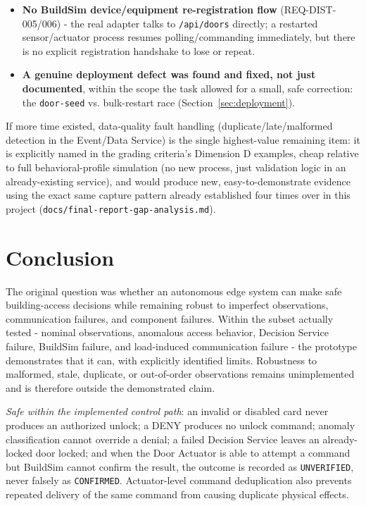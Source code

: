 \documentclass[11pt]{article}
\begin{document}
\begin{itemize}
(REQ-DATA-004/005, REQ-RES-003/005) - no freshness, ordering, or
deduplication logic exists anywhere in the pipeline yet.
\item \textbf{No BuildSim device/equipment re-registration flow}
(REQ-DIST-005/006) - the real adapter talks to \texttt{/api/doors}
directly; a restarted sensor/actuator process resumes polling/commanding
immediately, but there is no explicit registration handshake to lose or
repeat.
\item \textbf{A genuine deployment defect was found and fixed, not just
documented}, within the scope the task allowed for a small, safe
correction: the \texttt{door-seed} vs. bulk-restart race
(Section~\ref{sec:deployment}).
\end{itemize}

If more time existed, data-quality fault handling
(duplicate/late/malformed detection in the Event/Data Service) is the
single highest-value remaining item: it is explicitly named in the
grading criteria's Dimension D examples, cheap relative to full
behavioral-profile simulation (no new process, just validation logic in
an already-existing service), and would produce new, easy-to-demonstrate
evidence using the exact same capture pattern already established four
times over in this project (\texttt{docs/final-report-gap-analysis.md}).

\section{Conclusion}
\label{sec:conclusion}

The original question was whether an autonomous edge system can make
safe building-access decisions while remaining robust to imperfect
observations, communication failures, and component failures. Within the
subset actually tested - nominal observations, anomalous access
behavior, Decision Service failure, BuildSim failure, and load-induced
communication failure - the prototype demonstrates that it can, with
explicitly identified limits. Robustness to malformed, stale, duplicate,
or out-of-order observations remains unimplemented and is therefore
outside the demonstrated claim.

\emph{Safe within the implemented control path}: an invalid or disabled
card never produces an authorized unlock; a DENY produces no unlock
command; anomaly classification cannot override a denial; a failed
Decision Service leaves an already-locked door locked; and when the Door
Actuator is able to attempt a command but BuildSim cannot confirm the
result, the outcome is recorded as \texttt{UNVERIFIED}, never falsely as
\texttt{CONFIRMED}. Actuator-level command deduplication also prevents repeated delivery of
the same command from causing duplicate physical effects.
\end{document}
